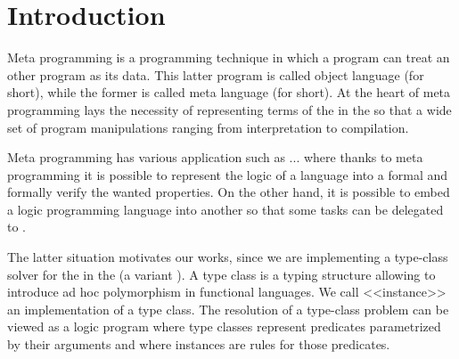 \documentclass{rapport}
\begin{document}
\section{Introduction}

Meta programming \cite{hill1994} is a programming technique in which a program
can treat an other program as its data. This latter program is called object
language (\ol for short), while the former is called meta language (\ml for
short). At the heart of meta programming lays the necessity of representing
terms of the \ol in the \ml so that a wide set of program
manipulations ranging from interpretation to compilation. 

Meta programming has various application such as ... where thanks to meta
programming it is possible to represent the logic of a language into a formal
and formally verify the wanted properties. On the other hand, it is possible to
embed a logic programming language into another so that some tasks can be
delegated to \ml.

The latter situation motivates our works, since we are implementing a type-class
solver for the \ol \coq in the \ml \elpi (a variant \lambdaprolog). A type class
\cite{wadler89, sozeau08} is a typing structure allowing to introduce ad hoc
polymorphism in functional languages. We call <<instance>> an implementation of
a type class. The resolution of a type-class problem can be viewed as a logic
program where type classes represent predicates parametrized by their arguments
and where instances are rules for those predicates. 




\end{document}
